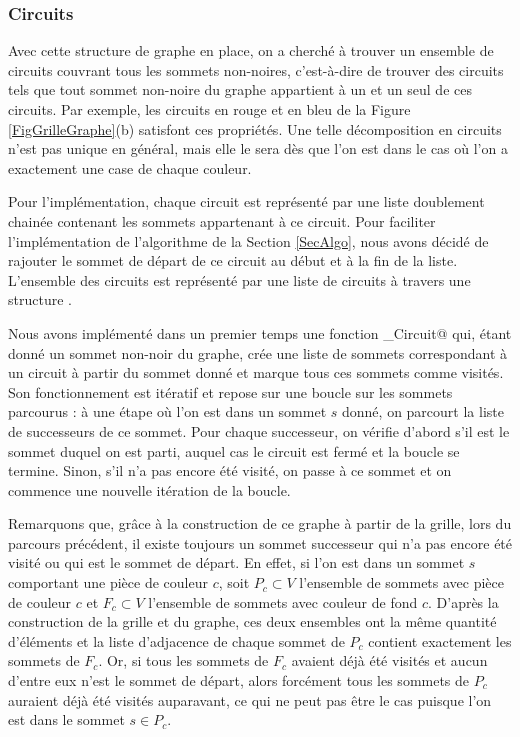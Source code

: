 \documentclass[a4paper,12pt]{article}
\numberwithin{equation}{section}
\begin{document}
\subsubsection*{Circuits}

Avec cette structure de graphe en place, on a cherché à trouver un ensemble de circuits couvrant tous les sommets non-noires, c'est-à-dire de trouver des circuits tels que tout sommet non-noire du graphe appartient à un et un seul de ces circuits. Par exemple, les circuits en rouge et en bleu de la Figure \ref{FigGrilleGraphe}(b) satisfont ces propriétés. Une telle décomposition en circuits n'est pas unique en général, mais elle le sera dès que l'on est dans le cas où l'on a exactement une case de chaque couleur.

Pour l'implémentation, chaque circuit est représenté par une liste doublement chainée contenant les sommets appartenant à ce circuit. Pour faciliter l'implémentation de l'algorithme de la Section \ref{SecAlgo}, nous avons décidé de rajouter le sommet de départ de ce circuit au début et à la fin de la liste. L'ensemble des circuits est représenté par une liste de circuits à travers une structure \verb@Lcircuit@.

Nous avons implémenté dans un premier temps une fonction \verb@Rech_Circuit@ qui, étant donné un sommet non-noir du graphe, crée une liste de sommets correspondant à un circuit à partir du sommet donné et marque tous ces sommets comme visités. Son fonctionnement est itératif et repose sur une boucle sur les sommets parcourus : à une étape où l'on est dans un sommet $s$ donné, on parcourt la liste de successeurs de ce sommet. Pour chaque successeur, on vérifie d'abord s'il est le sommet duquel on est parti, auquel cas le circuit est fermé et la boucle se termine. Sinon, s'il n'a pas encore été visité, on passe à ce sommet et on commence une nouvelle itération de la boucle.

Remarquons que, grâce à la construction de ce graphe à partir de la grille, lors du parcours précédent, il existe toujours un sommet successeur qui n'a pas encore été visité ou qui est le sommet de départ. En effet, si l'on est dans un sommet $s$ comportant une pièce de couleur $c$, soit $P_c \subset V$ l'ensemble de sommets avec pièce de couleur $c$ et $F_c \subset V$ l'ensemble de sommets avec couleur de fond $c$. D'après la construction de la grille et du graphe, ces deux ensembles ont la même quantité d'éléments et la liste d'adjacence de chaque sommet de $P_c$ contient exactement les sommets de $F_c$. Or, si tous les sommets de $F_c$ avaient déjà été visités et aucun d'entre eux n'est le sommet de départ, alors forcément tous les sommets de $P_c$ auraient déjà été visités auparavant, ce qui ne peut pas être le cas puisque l'on est dans le sommet $s \in P_c$.
\end{document}
